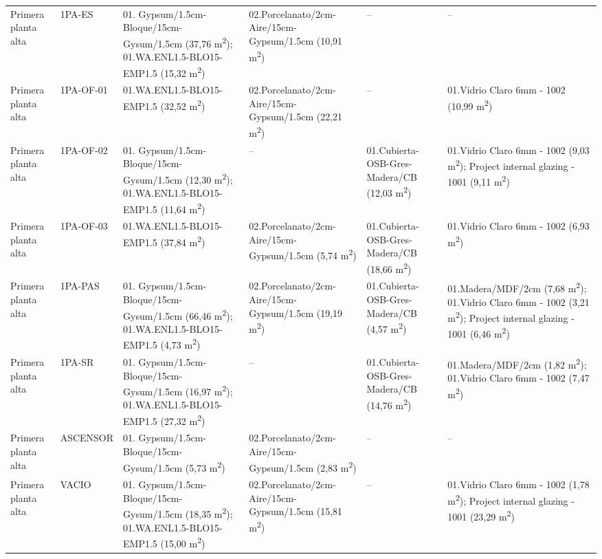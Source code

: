{\begin{longtable}{p{2.1cm}p{1.6cm}p{3.3cm}p{3.1cm}p{2.5cm}p{2.7cm}}
  Primera planta alta & 1PA-ES & 01. Gypsum/1.5cm-Bloque/15cm-Gysum/1.5cm (37,76 m\textsuperscript{2}); 01.WA.ENL1.5-BLO15-EMP1.5 (15,32 m\textsuperscript{2}) & 02.Porcelanato/2cm-Aire/15cm-Gypsum/1.5cm (10,91 m\textsuperscript{2}) & -- & -- \\
  Primera planta alta & 1PA-OF-01 & 01.WA.ENL1.5-BLO15-EMP1.5 (32,52 m\textsuperscript{2}) & 02.Porcelanato/2cm-Aire/15cm-Gypsum/1.5cm (22,21 m\textsuperscript{2}) & -- & 01.Vidrio Claro 6mm - 1002 (10,99 m\textsuperscript{2}) \\
  Primera planta alta & 1PA-OF-02 & 01. Gypsum/1.5cm-Bloque/15cm-Gysum/1.5cm (12,30 m\textsuperscript{2}); 01.WA.ENL1.5-BLO15-EMP1.5 (11,64 m\textsuperscript{2}) & -- & 01.Cubierta-OSB-Gres-Madera/CB (12,03 m\textsuperscript{2}) & 01.Vidrio Claro 6mm - 1002 (9,03 m\textsuperscript{2}); Project internal glazing - 1001 (9,11 m\textsuperscript{2}) \\
  Primera planta alta & 1PA-OF-03 & 01.WA.ENL1.5-BLO15-EMP1.5 (37,84 m\textsuperscript{2}) & 02.Porcelanato/2cm-Aire/15cm-Gypsum/1.5cm (5,74 m\textsuperscript{2}) & 01.Cubierta-OSB-Gres-Madera/CB (18,66 m\textsuperscript{2}) & 01.Vidrio Claro 6mm - 1002 (6,93 m\textsuperscript{2}) \\
  Primera planta alta & 1PA-PAS & 01. Gypsum/1.5cm-Bloque/15cm-Gysum/1.5cm (66,46 m\textsuperscript{2}); 01.WA.ENL1.5-BLO15-EMP1.5 (4,73 m\textsuperscript{2}) & 02.Porcelanato/2cm-Aire/15cm-Gypsum/1.5cm (19,19 m\textsuperscript{2}) & 01.Cubierta-OSB-Gres-Madera/CB (4,57 m\textsuperscript{2}) & 01.Madera/MDF/2cm (7,68 m\textsuperscript{2}); 01.Vidrio Claro 6mm - 1002 (3,21 m\textsuperscript{2}); Project internal glazing - 1001 (6,46 m\textsuperscript{2}) \\
  Primera planta alta & 1PA-SR & 01. Gypsum/1.5cm-Bloque/15cm-Gysum/1.5cm (16,97 m\textsuperscript{2}); 01.WA.ENL1.5-BLO15-EMP1.5 (27,32 m\textsuperscript{2}) & -- & 01.Cubierta-OSB-Gres-Madera/CB (14,76 m\textsuperscript{2}) & 01.Madera/MDF/2cm (1,82 m\textsuperscript{2}); 01.Vidrio Claro 6mm - 1002 (7,47 m\textsuperscript{2}) \\
  Primera planta alta & ASCENSOR & 01. Gypsum/1.5cm-Bloque/15cm-Gysum/1.5cm (5,73 m\textsuperscript{2}) & 02.Porcelanato/2cm-Aire/15cm-Gypsum/1.5cm (2,83 m\textsuperscript{2}) & -- & -- \\
  Primera planta alta & VACIO & 01. Gypsum/1.5cm-Bloque/15cm-Gysum/1.5cm (18,35 m\textsuperscript{2}); 01.WA.ENL1.5-BLO15-EMP1.5 (15,00 m\textsuperscript{2}) & 02.Porcelanato/2cm-Aire/15cm-Gypsum/1.5cm (15,81 m\textsuperscript{2}) & -- & 01.Vidrio Claro 6mm - 1002 (1,78 m\textsuperscript{2}); Project internal glazing - 1001 (23,29 m\textsuperscript{2}) \\

\end{longtable}}
